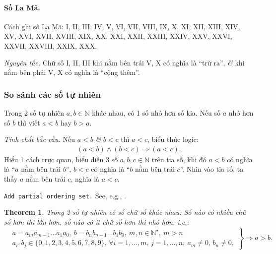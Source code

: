 \documentclass{article}
\numberwithin{equation}{section}
\newtheorem{theorem}{Theorem}[section]
\begin{document}
\paragraph{Số La Mã.} Cách ghi số La Mã: I, II, III, IV, V, VI, VII, VIII, IX, X, XI, XII, XIII, XIV, XV, XVI, XVII, XVIII, XIX, XX, XXI, XXII, XXIII, XXIV, XXV, XXVI, XXVII, XXVIII, XXIX, XXX.

\textit{Nguyên tắc.} Chữ số I, II, III khi nằm bên trái V, X có nghĩa là ``trừ ra'', \textit{\&} khi nằm bên phải V, X có nghĩa là ``cộng thêm''.

\subsubsection{So sánh các số tự nhiên}
Trong 2 số tự nhiên $a,b\in\mathbb{N}$ khác nhau, có 1 số nhỏ hơn số kia. Nếu số $a$ nhỏ hơn số $b$ thì viết $a < b$ hay $b > a$.

\textit{Tính chất bắc cầu.} Nếu $a < b$ \textit{\&} $b < c$ thì $a < c$, biểu thức logic:
\begin{align*}
	(a < b)\land(b < c)\Rightarrow(a < c).
\end{align*}
Hiểu 1 cách trực quan, biểu diễn 3 số $a,b,c\in\mathbb{N}$ trên tia số, khi đó $a < b$ có nghĩa là ``$a$ nằm bên trái $b$'', $b < c$ có nghĩa là ``$b$ nằm bên trái $c$''. Nhìn vào tia số, ta thấy $a$ nằm bên trái $c$, nghĩa là $a < c$.

\texttt{Add partial ordering set.} See, e.g., \cite{Halmos1960, Halmos1974, Kaplansky1972, Kaplansky1977}.

\begin{theorem}
	Trong 2 số tự nhiên có số chữ số khác nhau: Số nào có nhiều chữ số hơn thì lớn hơn, số nào có ít chữ số hơn thì nhỏ hơn, i.e.:
	\begin{equation}
		\label{compare number of digits}
		\left.\begin{split}
			&a = \overline{a_ma_{m-1}\ldots a_1a_0},\ b = \overline{b_nb_{n-1}\ldots b_1b_0},\ m,n\in\mathbb{N}^\star,\ m > n\\
			&a_i,b_j\in\{0,1,2,3,4,5,6,7,8,9\},\,\forall i = 1,\ldots,m,\,j = 1,\ldots,n,\ a_m\ne 0,\,b_n\ne 0,
		\end{split}\right\}\Rightarrow a > b.		
	\end{equation}
\end{theorem}
\end{document}
